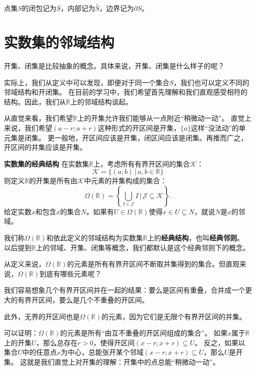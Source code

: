 \documentclass[12pt,UTF8]{ctexbook}
\begin{document}
点集$S$的闭包记为$\overline{S}$，内部记为$\overset{\circ}{S}$，边界记为$\partial S$。

\section{实数集的邻域结构}

开集、闭集是比较抽象的概念。具体来说，开集、闭集是什么样子的呢？

实际上，我们从定义中可以发现，即便对于同一个集合$S$，我们也可以定义不同的邻域结构和开闭集。
在目前的学习中，我们希望首先理解和我们直观感受相符的结构。因此，我们从$\mathbb{R}$上的邻域结构谈起。

从直觉来看，我们希望$\mathbb{R}$上的开集允许我们能够从一点附近“稍微动一动”。
直觉上来说，我们希望$(a-r;a+r)$这种形式的开区间是开集，$\{a\}$这样“没法动”的单元集是闭集。
更一般地，开区间应该是开集，闭区间应该是闭集。再推而广之，开区间的并集应该是开集。

\begin{tm}{\textbf{实数集的经典结构}}
    在实数集$\mathbb{R}$上，考虑所有有界开区间的集合$\mathcal{K}$：
    $$ \mathcal{K} = \{ (a;b) \, | \, a, b \in \mathbb{R} \}$$
    则定义$\mathbb{R}$的开集是所有由$\mathcal{K}$中元素的并集构成的集合：
    $$ \Omega(\mathbb{R}) = \left\{\bigcup_{I \in \mathcal{J}} I \, \Bigg| \,\mathcal{J} \subseteq  \mathcal{K} \right\}.$$
    给定实数$x$和包含$x$的集合$N$。如果有$U\in\Omega(\mathbb{R})$使得$x\in U\subseteq N$，就说$N$是$x$的邻域。

    我们称$\Omega(\mathbb{R})$和依此定义的邻域结构为实数集$\mathbb{R}$上的\textbf{经典结构}，也叫\textbf{经典邻则}。
    以后提到$\mathbb{R}$上的邻域、开集、闭集等概念，我们都默认是这个经典邻则下的概念。
\end{tm}

从定义来说，$\Omega(\mathbb{R})$的元素是所有有界开区间不断取并集得到的集合。但直观来说，$\Omega(\mathbb{R})$到底有哪些元素呢？

我们容易想象几个有界开区间并在一起的结果：要么是区间有重叠，合并成一个更大的有界开区间，要么是几个不重叠的开区间。

此外，无界的开区间也是$\Omega(\mathbb{R})$的元素，因为它们是无限个有界开区间的并集。

可以证明：$\Omega(\mathbb{R})$的元素是所有“由互不重叠的开区间组成的集合”。
如果$x$属于$\mathbb{R}$上的开集$U$，那么总存在$r>0$，使得开区间$(x-r;x+r)\subseteq U$。
反之，如果以集合$U$中的任意点$x$为中心，总能张开某个邻域$(x-r;x+r)\subseteq U$，那么$U$是开集。
这就是我们直觉上对开集的理解：开集中的点总能“稍微动一动”。
\end{document}
